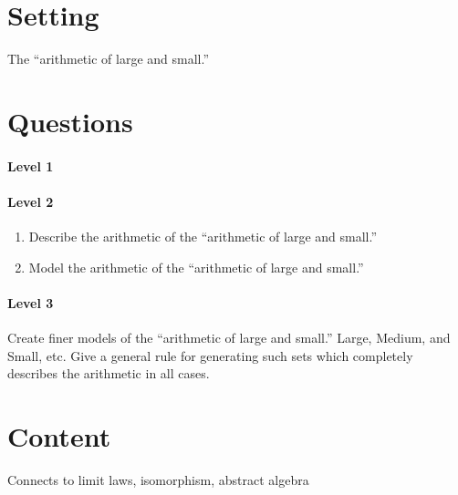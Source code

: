 \documentclass{ximera}
\begin{document}
\section{Setting}

\vfil

The ``arithmetic of large and small.''

\vfil

\vfil

\newpage


\section{Questions}

\paragraph{Level 1}

\paragraph{Level 2}

\begin{enumerate}
\item Describe the arithmetic of the ``arithmetic of large and small.''
\item Model the arithmetic of the ``arithmetic of large and small.''
\end{enumerate}

\paragraph{Level 3}
\item Create finer models of the ``arithmetic of large and small.''
  Large, Medium, and Small, etc. Give a general rule for generating
  such sets which completely describes the arithmetic in all cases. 


  \section{Content}

  Connects to limit laws, isomorphism, abstract algebra
\end{document}
